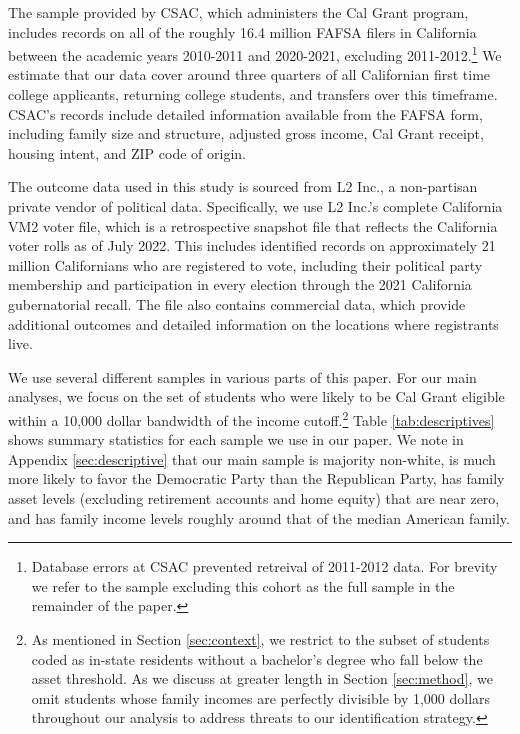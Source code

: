 \documentclass[12pt,letterpaper,oneside]{book}
\begin{document}
The sample provided by CSAC, which administers the Cal Grant program, includes records on all of the roughly 16.4 million FAFSA filers in California between the academic years 2010-2011 and 2020-2021, excluding 2011-2012.\footnote{Database errors at CSAC prevented retreival of 2011-2012 data. For brevity we refer to the sample excluding this cohort as the full sample in the remainder of the paper.} We estimate that our data cover around three quarters of all Californian first time college applicants, returning college students, and transfers over this timeframe. CSAC's records include detailed information available from the FAFSA form, including family size and structure, adjusted gross income, Cal Grant receipt, housing intent, and ZIP code of origin.

The outcome data used in this study is sourced from L2 Inc., a non-partisan private vendor of political data. Specifically, we use L2 Inc.'s complete California VM2 voter file, which is a retrospective snapshot file that reflects the California voter rolls as of July 2022. This includes identified records on approximately 21 million Californians who are registered to vote, including their political party membership and participation in every election through the 2021 California gubernatorial recall. The file also contains commercial data, which provide additional outcomes and detailed information on the locations where registrants live.

We use several different samples in various parts of this paper. For our main analyses, we focus on the set of students who were likely to be Cal Grant eligible within a 10,000 dollar bandwidth of the income cutoff.\footnote{As mentioned in Section \ref{sec:context}, we restrict to the subset of students coded as in-state residents without a bachelor's degree who fall below the asset threshold. As we discuss at greater length in Section \ref{sec:method}, we omit students whose family incomes are perfectly divisible by 1,000 dollars throughout our analysis to address threats to our identification strategy.} Table \ref{tab:descriptives} shows summary statistics for each sample we use in our paper. We note in Appendix \ref{sec:descriptive} that our main sample is majority non-white, is much more likely to favor the Democratic Party than the Republican Party, has family asset levels (excluding retirement accounts and home equity) that are near zero, and has family income levels roughly around that of the median American family.
\end{document}
